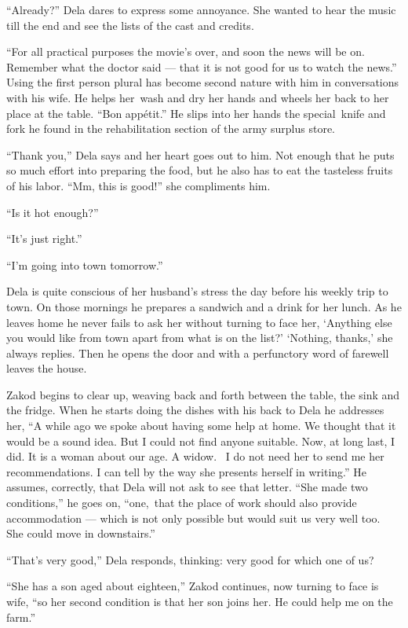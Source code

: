 \documentclass[twoside,11pt]{book}
\begin{document}
``Already?'' Dela dares to express some annoyance. She wanted to hear the music till the end
and see the lists of the cast and credits.

``For all practical purposes the movie's over, and soon the news will be on. Remember what the doctor said
--- that it is not good for us to watch the news.'' Using the first person plural has become second nature
with him in conversations with his wife. He helps her~wash and dry her hands and wheels her back to her place at the
table. ``Bon app\'etit.'' He slips into her hands the special~knife and fork he found in the
rehabilitation section of the army surplus store.

``Thank you,'' Dela says and her heart goes out to him. Not enough that he puts so much effort
into preparing the food, but he also has to eat the tasteless fruits of his labor. ``Mm, this is good!''
she compliments him.

``Is it hot enough?''

``It's just right.''

``I'm going into town tomorrow.''

Dela is quite conscious of her husband's stress the day before his weekly trip to town. On those mornings he prepares a
sandwich and a drink for her lunch. As he leaves home he never fails to ask her without turning to face her, `Anything
else you would like from town apart from what is on the list?'  `Nothing, thanks,' she always replies. Then he
opens the door and with a perfunctory word of farewell leaves the house.

Zakod begins to clear up, weaving back and forth between the table, the sink and the fridge. When he starts doing the
dishes with his back to Dela he addresses her, ``A while ago we spoke about having some help at home. We
thought that it would be a sound idea. But I could not find anyone suitable. Now, at long last, I did. It is a woman
about our age. A widow.~ I do not need her to send me her recommendations. I can tell by the way she presents herself
in writing.''  He assumes, correctly, that Dela will not ask to see that letter.  ``She
made two conditions,'' he goes on, ``one,~that the place of work should also provide accommodation --- which
is not only possible but would suit us very well too.~ She could move in downstairs.''

``That's very good,'' Dela responds, thinking: very good for which one of us?

``She has a son aged about eighteen,'' Zakod continues, now turning to face is wife,
``so her second condition is that her son joins her. He could help me on the farm.''
\end{document}
